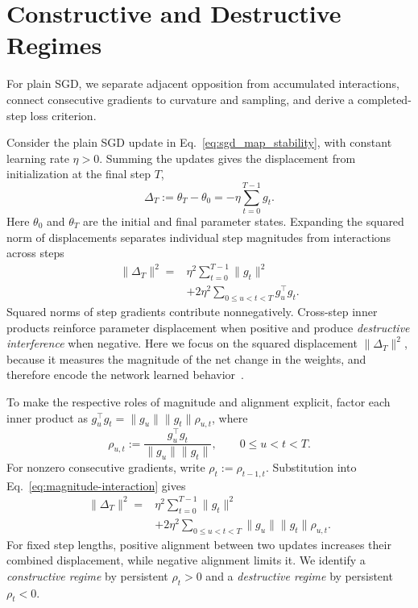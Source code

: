 \section{Constructive and Destructive Regimes}
\label{sec:displacement}\label{sec:regimes}

For plain SGD, we separate adjacent opposition from accumulated interactions, connect consecutive gradients to curvature and sampling, and derive a completed-step loss criterion.

Consider the plain SGD update in Eq.~\eqref{eq:sgd_map_stability}, with constant learning rate $\eta>0$. Summing the updates gives the displacement from initialization at the final step $T$,
\begin{equation}
  \Delta_T:=\theta_T-\theta_0=-\eta\sum_{t=0}^{T-1} g_t.
  \label{eq:displacement}
\end{equation}
Here $\theta_0$ and $\theta_T$ are the initial and final parameter states. Expanding the squared norm of displacements separates individual step magnitudes from interactions across steps
\begin{equation}
\begin{aligned}
  \|\Delta_T\|^2
  ={}&\eta^2\sum_{t=0}^{T-1}\|g_t\|^2\\
     &+2\eta^2\sum_{0\leq u<t<T}g_u^\top g_t.
\end{aligned}
\label{eq:magnitude-interaction}
\end{equation}
Squared norms of step gradients contribute nonnegatively. Cross-step inner products reinforce parameter displacement when positive and produce \emph{destructive interference} when negative. Here we focus on the squared displacement $\|\Delta_T\|^2$, because it measures the magnitude of the net change in the weights, and therefore encode the network learned behavior~\cite{ilharco2023task, nagarajan2019distance}.

To make the respective roles of magnitude and alignment explicit, factor each inner product as $g_u^\top g_t=\|g_u\|\|g_t\|\rho_{u,t}$, where
\begin{equation}
  \rho_{u,t}:=\frac{g_u^\top g_t}{\|g_u\|\|g_t\|},
  \qquad 0\leq u<t<T.
  \label{eq:rho}
\end{equation}
For nonzero consecutive gradients, write $\rho_t:=\rho_{t-1,t}$. Substitution into Eq.~\eqref{eq:magnitude-interaction} gives
\begin{equation}
\begin{aligned}
\|\Delta_T\|^2={}&\eta^2\sum_{t=0}^{T-1}\|g_t\|^2\\
 &+2\eta^2\sum_{0\leq u<t<T}
    \|g_u\|\|g_t\|\rho_{u,t}.
\end{aligned}
\label{eq:magnitude-alignment}
\end{equation}
For fixed step lengths, positive alignment between two updates increases their combined displacement, while negative alignment limits it. We identify a \emph{constructive regime} by persistent $\rho_t>0$ and a \emph{destructive regime} by persistent $\rho_t<0$.

